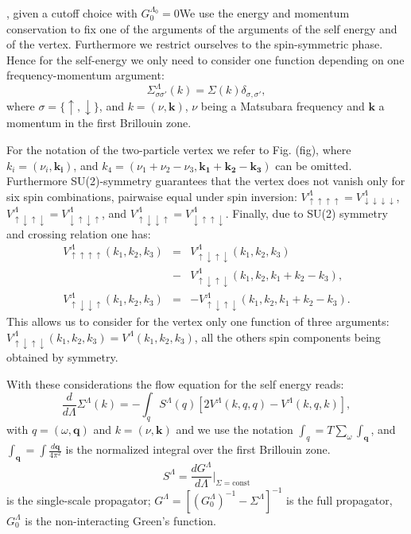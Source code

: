 , given a cutoff choice with $G_0^{\Lambda_0}=0$We use the energy and momentum conservation to fix one of the arguments of the arguments of the self energy and of the vertex. 
Furthermore we restrict ourselves to the spin-symmetric phase. 
Hence for the self-energy  we only need to consider one function depending on one frequency-momentum argument: 
\begin{equation}
\Sigma^\Lambda_{\sigma\sigma'}(k)=\Sigma(k)\delta_{\sigma,\sigma'}, 
\end{equation}
where $\sigma = \{\uparrow, \downarrow\} $, and $k=(\nu,\mathbf{k})$, $\nu$ being a Matsubara frequency and $\mathbf{k}$ a momentum in the first Brillouin zone. 

For the notation of the two-particle vertex we refer to Fig. (fig), where $k_i=(\nu_i,\mathbf{k_i})$,
and $k_4=(\nu_1+\nu_2-\nu_3,\mathbf{k_1+k_2-k_3})$ can be omitted. 
Furthermore  SU(2)-symmetry guarantees that the vertex does not vanish only for six spin combinations, pairwaise equal under spin inversion:
$
 V^\Lambda_{\uparrow\uparrow\uparrow\uparrow} = V^\Lambda_{\downarrow\downarrow\downarrow\downarrow}$, 
$  V^\Lambda_{\uparrow\downarrow\uparrow\downarrow} = V^\Lambda_{\downarrow\uparrow\downarrow\uparrow}  $, and
$  V^\Lambda_{\uparrow\downarrow\downarrow\uparrow } = V^\Lambda_{\downarrow\uparrow\uparrow\downarrow}$.   
Finally, due to SU(2) symmetry and crossing relation one has: 
\begin{eqnarray}
\nonumber
V^\Lambda_{\uparrow\uparrow\uparrow\uparrow}(k_1,k_2,k_3) &=& V^\Lambda_{\uparrow\downarrow\uparrow\downarrow}(k_1,k_2,k_3)\\&-& V^\Lambda_{\uparrow\downarrow\uparrow\downarrow}(k_1,k_2,k_1+k_2-k_3), \\ 
V^\Lambda_{\uparrow\downarrow\downarrow\uparrow}(k_1,k_2,k_3)& =& -V^\Lambda_{\uparrow\downarrow\uparrow\downarrow}(k_1,k_2,k_1+k_2-k_3).
\end{eqnarray}
This allows us to consider for the vertex only one function of three arguments:  $V^\Lambda_{\uparrow\downarrow\uparrow\downarrow}(k_1,k_2,k_3)=V^\Lambda(k_1,k_2,k_3)$, all the others spin components being obtained by symmetry. 

With these considerations the flow equation for the self energy reads: 
\begin{equation}
\frac{d}{d \Lambda} \Sigma^\Lambda(k)= -\int_q  S^\Lambda(q)\left[2V^\Lambda(k,q,q) -V^\Lambda(k,q,k)\right], 
\end{equation}
with $q=(\omega,\mathbf{q})$ and $k = (\nu,\mathbf{k})$ and we use the notation  $\int_{q} =T\sum_\omega \int_{\mathbf{q}}$, and $\int_{\mathbf{q}}=\int  \frac{d\mathbf{q}}{4\pi^2}$ is the normalized integral over the first Brillouin zone. 
\begin{equation}
 S^\Lambda=\frac{dG^\Lambda}{d\Lambda}\Bigg|_{\Sigma=\mathrm{const}} 
\end{equation}
  is the single-scale propagator; $G^\Lambda=\left[(G_0^\Lambda)^{-1}-\Sigma^\Lambda\right]^{-1}$ is the full propagator,  $G_0^\Lambda$ is the non-interacting Green's function. 
  
